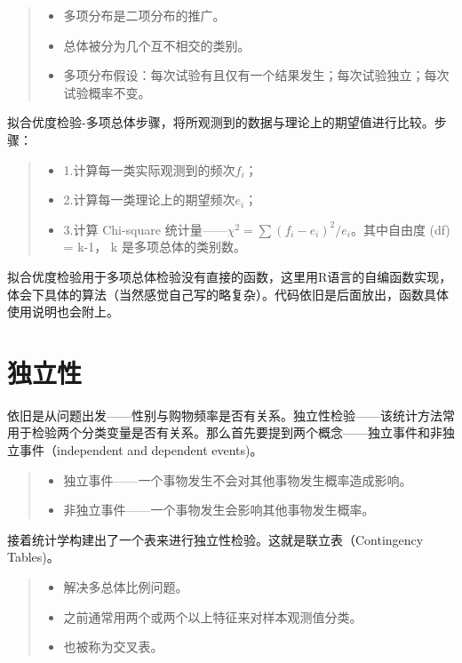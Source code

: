 \documentclass[]{ctexbook}
\providecommand{\tightlist}{%
  \setlength{\itemsep}{0pt}\setlength{\parskip}{0pt}}
\begin{document}
\begin{quote}
\begin{itemize}
\tightlist
\item
  多项分布是二项分布的推广。
\item
  总体被分为几个互不相交的类别。
\item
  多项分布假设：每次试验有且仅有一个结果发生；每次试验独立；每次试验概率不变。
\end{itemize}
\end{quote}

拟合优度检验-多项总体步骤，将所观测到的数据与理论上的期望值进行比较。步骤：

\begin{quote}
\begin{itemize}
\tightlist
\item
  1.计算每一类实际观测到的频次\(f_i\)；
\item
  2.计算每一类理论上的期望频次\(e_i\)；
\item
  3.计算 Chi-square 统计量------\(\chi^2=\sum(f_i-e_i)^2/e_i\)。其中自由度 (df) = k-1， k 是多项总体的类别数。
\end{itemize}
\end{quote}

拟合优度检验用于多项总体检验没有直接的函数，这里用R语言的自编函数实现，体会下具体的算法（当然感觉自己写的略复杂）。代码依旧是后面放出，函数具体使用说明也会附上。

\hypertarget{ux72ecux7acbux6027}{%
\section{独立性}\label{ux72ecux7acbux6027}}

依旧是从问题出发------性别与购物频率是否有关系。独立性检验------该统计方法常用于检验两个分类变量是否有关系。那么首先要提到两个概念------独立事件和非独立事件（independent and dependent events)。

\begin{quote}
\begin{itemize}
\tightlist
\item
  独立事件------一个事物发生不会对其他事物发生概率造成影响。
\item
  非独立事件------一个事物发生会影响其他事物发生概率。
\end{itemize}
\end{quote}

接着统计学构建出了一个表来进行独立性检验。这就是联立表（Contingency Tables)。

\begin{quote}
\begin{itemize}
\tightlist
\item
  解决多总体比例问题。
\item
  之前通常用两个或两个以上特征来对样本观测值分类。
\item
  也被称为交叉表。
\end{itemize}
\end{quote}
\end{document}
